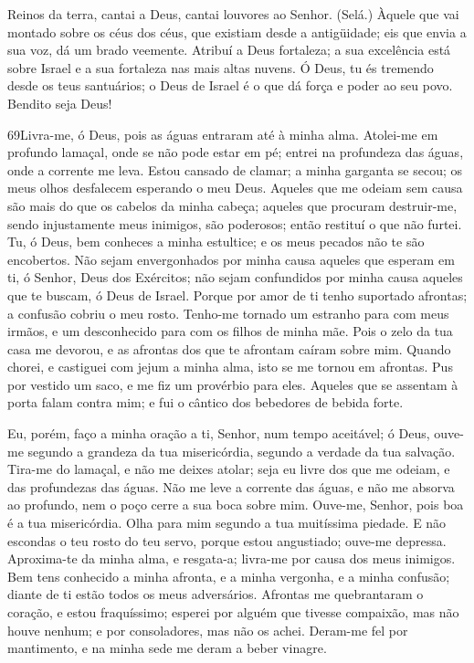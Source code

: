 Reinos da terra, cantai a Deus, cantai louvores ao Senhor.
(Selá.) Àquele que vai montado sobre os céus dos céus, que
existiam desde a antigüidade; eis que envia a sua voz, dá um brado
veemente. Atribuí a Deus fortaleza; a sua excelência está
sobre Israel e a sua fortaleza nas mais altas nuvens. Ó Deus,
tu és tremendo desde os teus santuários; o Deus de Israel é o que dá
força e poder ao seu povo. Bendito seja Deus!

\bigskip

\lettrine{69}{}Livra-me, ó Deus, pois as águas entraram até à
minha alma. Atolei-me em profundo lamaçal, onde se não pode
estar em pé; entrei na profundeza das águas, onde a corrente me
leva. Estou cansado de clamar; a minha garganta se secou; os
meus olhos desfalecem esperando o meu Deus. Aqueles que me
odeiam sem causa são mais do que os cabelos da minha cabeça; aqueles
que procuram destruir-me, sendo injustamente meus inimigos, são
poderosos; então restituí o que não furtei. Tu, ó Deus, bem
conheces a minha estultice; e os meus pecados não te são encobertos.
Não sejam envergonhados por minha causa aqueles que esperam em
ti, ó Senhor, Deus dos Exércitos; não sejam confundidos por minha
causa aqueles que te buscam, ó Deus de Israel. Porque por amor
de ti tenho suportado afrontas; a confusão cobriu o meu rosto.
Tenho-me tornado um estranho para com meus irmãos, e um
desconhecido para com os filhos de minha mãe. Pois o zelo da tua
casa me devorou, e as afrontas dos que te afrontam caíram sobre mim.
Quando chorei, e castiguei com jejum a minha alma, isto se me
tornou em afrontas. Pus por vestido um saco, e me fiz um
provérbio para eles. Aqueles que se assentam à porta falam
contra mim; e fui o cântico dos bebedores de bebida forte.

Eu, porém, faço a minha oração a ti, Senhor, num tempo aceitável;
ó Deus, ouve-me segundo a grandeza da tua misericórdia, segundo a
verdade da tua salvação. Tira-me do lamaçal, e não me deixes
atolar; seja eu livre dos que me odeiam, e das profundezas das
águas. Não me leve a corrente das águas, e não me absorva ao
profundo, nem o poço cerre a sua boca sobre mim. Ouve-me,
Senhor, pois boa é a tua misericórdia. Olha para mim segundo a tua
muitíssima piedade. E não escondas o teu rosto do teu servo,
porque estou angustiado; ouve-me depressa. Aproxima-te da
minha alma, e resgata-a; livra-me por causa dos meus inimigos.
Bem tens conhecido a minha afronta, e a minha vergonha, e a
minha confusão; diante de ti estão todos os meus adversários.
Afrontas me quebrantaram o coração, e estou fraquíssimo;
esperei por alguém que tivesse compaixão, mas não houve nenhum; e
por consoladores, mas não os achei. Deram-me fel por
mantimento, e na minha sede me deram a beber vinagre.

